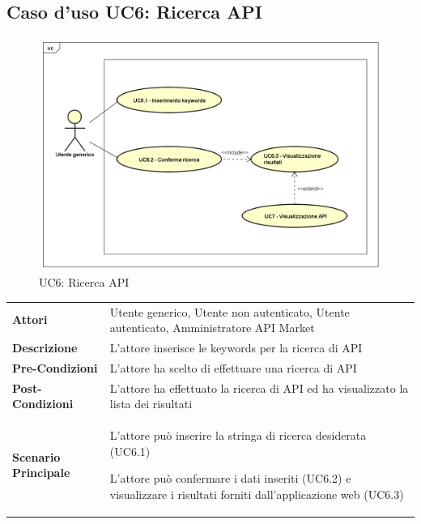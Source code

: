 \newpage
\subsection{Caso d'uso UC6: Ricerca API}
\label{UC6}
\begin{figure}[ht]
	\centering
	\includegraphics[scale=0.45]{UML/UC6.png}
	\caption{UC6: Ricerca API}
\end{figure}

\begin{longtable}{ l | p{11cm}}
	\hline
	\rowcolor{Gray}
	 \multicolumn{2}{c}{UC6 - Ricerca API} \\
	 \hline
	\textbf{Attori} & Utente generico, Utente non autenticato, Utente autenticato, Amministratore API Market \\
	\textbf{Descrizione} & L'attore inserisce le keywords per la ricerca di API \\
	\textbf{Pre-Condizioni} & L'attore ha scelto di effettuare una ricerca di API \\
	\textbf{Post-Condizioni} & L'attore ha effettuato la ricerca di API ed ha visualizzato la lista dei risultati \\
	\textbf{Scenario Principale} & 
	\begin{enumerate*}[label=(\arabic*.),itemjoin={\newline}]
		\item L'attore può inserire la stringa di ricerca desiderata (UC6.1)
		\item L'attore può confermare i dati inseriti (UC6.2) e visualizzare i risultati forniti dall'applicazione web (UC6.3)
	\end{enumerate*}\\
\end{longtable}
